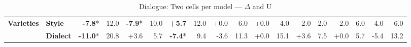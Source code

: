 \begin{table}[h]
{\begin{tabular}{llrrrrrrrrrrrrrrrr}
\midrule
\textbf{Varieties} & \textbf{Style} & \cellcolor{red!15} \textbf{-7.8}* & \cellcolor{blue!31} 12.0 & \cellcolor{red!15} \textbf{-7.9}* & \cellcolor{blue!26} 10.0 & \cellcolor{green!11} \textbf{+5.7} & \cellcolor{blue!31} 12.0 & \cellcolor{red!0} +0.0 & \cellcolor{blue!15} 6.0 & \cellcolor{red!0} +0.0 & \cellcolor{blue!10} 4.0 & \cellcolor{red!3} -2.0 & \cellcolor{blue!5} 2.0 & \cellcolor{red!3} -2.0 & \cellcolor{blue!15} 6.0 & \cellcolor{red!7} -4.0 & \cellcolor{blue!15} 6.0 \\
  & \textbf{Dialect} & \cellcolor{red!20} \textbf{-11.0}* & \cellcolor{blue!54} 20.8 & \cellcolor{green!7} +3.6 & \cellcolor{blue!15} 5.7 & \cellcolor{red!14} \textbf{-7.4}* & \cellcolor{blue!24} 9.4 & \cellcolor{red!7} -3.6 & \cellcolor{blue!29} 11.3 & \cellcolor{red!0} +0.0 & \cellcolor{blue!39} 15.1 & \cellcolor{green!7} +3.6 & \cellcolor{blue!19} 7.5 & \cellcolor{red!0} +0.0 & \cellcolor{blue!15} 5.7 & \cellcolor{red!10} -5.4 & \cellcolor{blue!34} 13.2 \\
\bottomrule
\end{tabular}}
\caption{Dialogue: Two cells per model — $\Delta$ and U}\label{tab:dialogue_combined_cells}
\end{table}